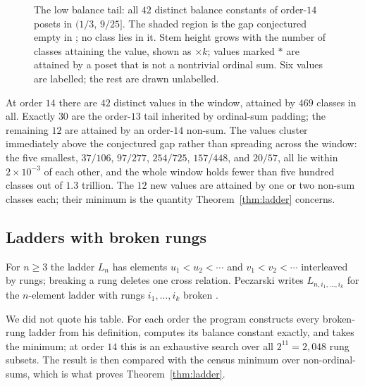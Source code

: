 \documentclass[11pt]{article}
\theoremstyle{definition}
\newcommand{\NTAILVALUES}{42}
\newcommand{\NTAILCLASSES}{469}
\begin{document}
\begin{figure}[ht]
\centering

\caption{The low balance tail: all $\NTAILVALUES$ distinct balance constants
of order-$14$ posets in $(1/3,\,9/25]$.  The shaded region is the gap
conjectured empty in \cite{peczarski-ladders}; no class lies in it.  Stem
height grows with the number of classes attaining the value, shown as
$\times k$; values marked $\ast$ are attained by a poset that is not a
nontrivial ordinal sum.  Six values are labelled; the rest are drawn
unlabelled.}
\label{fig:tail}
\end{figure}

At order $14$ there are $\NTAILVALUES$ distinct values in the window, attained
by $\NTAILCLASSES$ classes in all.  Exactly $30$ are the order-$13$ tail
inherited by ordinal-sum padding; the remaining $12$ are attained by an
order-$14$ non-sum.  The values cluster immediately above the conjectured gap
rather than spreading across the window: the five smallest,
$37/106$, $97/277$, $254/725$, $157/448$, and $20/57$, all lie within
$2\times10^{-3}$ of each other, and the whole window holds fewer than five
hundred classes out of $1.3$ trillion.  The $12$ new values are attained by
one or two non-sum classes each; their minimum is the quantity
Theorem~\ref{thm:ladder} concerns.

\subsection{Ladders with broken rungs}

For $n\geq3$ the ladder $L_n$ has elements $u_1<u_2<\cdots$ and
$v_1<v_2<\cdots$ interleaved by rungs; breaking a rung deletes one cross
relation.  Peczarski writes $L_{n,i_1,\ldots,i_k}$ for the $n$-element ladder
with rungs $i_1,\ldots,i_k$ broken \cite{peczarski-ladders}.

We did not quote his table.  For each order the program constructs every
broken-rung ladder from his definition, computes its balance constant exactly,
and takes the minimum; at order $14$ this is an exhaustive search over all
$2^{11}=2{,}048$ rung subsets.  The result is then compared with the census
minimum over non-ordinal-sums, which is what proves Theorem~\ref{thm:ladder}.
\end{document}
